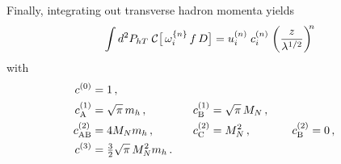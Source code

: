 \documentclass[a4paper,11pt]{article}
\newcommand{\be}{\begin{equation}}
\newcommand{\ee}{\end{equation}}
\newcommand{\mh}{ m_h }
\def\Phperp{P_{hT}}
\newcommand*{\BibPath}{.}%
\begin{document}
Finally, integrating out transverse hadron momenta yields
\be
	\int d^2\Phperp\;
	{\cal C}\bigl[\,\omega^{\{n\}}_{i} \, f \, D \bigr]
	= u^{(n)}_{i} \;c^{(n)}_{i}\;\biggl(\frac{z}{\lambda^{1/2}}\biggr)^{\!\!n}
\ee
with
\begin{alignat}{7}
	c^{(0)}_{\rm  } 	&= 1 \, , \\
	c^{(1)}_{\rm A} 	&= \sqrt{\pi}\,\mh	\, , &
	c^{(1)}_{\rm B} 	&= \sqrt{\pi}\,M_N	\, , \\
	c^{(2)}_{\rm AB} 	&= 4M_N\mh		\, , \;\;\;\;\;\; &
	c^{(2)}_{\rm C} 	&= M_N^2 		\, , \;\;\;\;\;\;\;\;\;\; &
	c^{(2)}_{\rm B}	&= 0 			\, ,\\
	c^{(3)}_{\rm  } 	&= {\textstyle\frac32}\sqrt{\pi} \,M_N^2\mh
	\, . \;\;\;     &
			&
	\label{Eq:Gaussian-integrals-working-IV}
\end{alignat}





\end{document}
